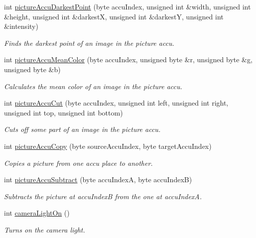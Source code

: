 \begin{DoxyCompactItemize}
int \hyperlink{robot_sensors_8nxc_aef60af0c88c7700fc20a0cf199296e38}{picture\-Accu\-Darkest\-Point} (byte accu\-Index, unsigned int \&width, unsigned int \&height, unsigned int \&darkest\-X, unsigned int \&darkest\-Y, unsigned int \&intensity)
\begin{DoxyCompactList}\small\item\em Finds the darkest point of an image in the picture accu. \end{DoxyCompactList}\item 
int \hyperlink{robot_sensors_8nxc_af9ed31a06a495cfbd17adf6c155441fd}{picture\-Accu\-Mean\-Color} (byte accu\-Index, unsigned byte \&r, unsigned byte \&g, unsigned byte \&b)
\begin{DoxyCompactList}\small\item\em Calculates the mean color of an image in the picture accu. \end{DoxyCompactList}\item 
int \hyperlink{robot_sensors_8nxc_ae8bd5459aae2278092545c2422be9621}{picture\-Accu\-Cut} (byte accu\-Index, unsigned int left, unsigned int right, unsigned int top, unsigned int bottom)
\begin{DoxyCompactList}\small\item\em Cuts off some part of an image in the picture accu. \end{DoxyCompactList}\item 
int \hyperlink{robot_sensors_8nxc_a1ff85605f55607952df1ad6dcc3562bd}{picture\-Accu\-Copy} (byte source\-Accu\-Index, byte target\-Accu\-Index)
\begin{DoxyCompactList}\small\item\em Copies a picture from one accu place to another. \end{DoxyCompactList}\item 
int \hyperlink{robot_sensors_8nxc_a4d93d17c77ce328fd44b476ce59d104e}{picture\-Accu\-Subtract} (byte accu\-Index\-A, byte accu\-Index\-B)
\begin{DoxyCompactList}\small\item\em Subtracts the picture at accu\-Index\-B from the one at accu\-Index\-A. \end{DoxyCompactList}\item 
int \hyperlink{robot_sensors_8nxc_a3ae13e4e7ce0c411a9ce609a2858f9b8}{camera\-Light\-On} ()
\begin{DoxyCompactList}\small\item\em Turns on the camera light. \end{DoxyCompactList}\item 

\end{DoxyCompactItemize}
